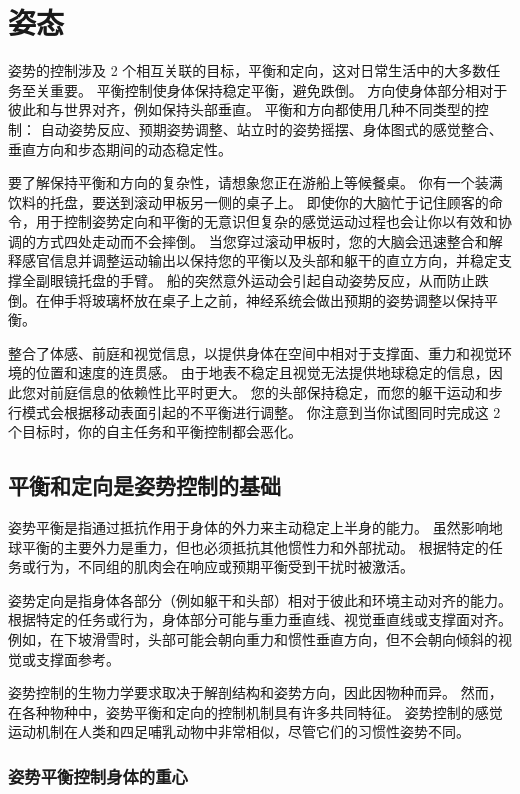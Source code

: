 \chapter{姿态} \label{chap:chap36}

姿势的控制涉及 2 个相互关联的目标，平衡和定向，这对日常生活中的大多数任务至关重要。
平衡控制使身体保持稳定平衡，避免跌倒。
方向使身体部分相对于彼此和与世界对齐，例如保持头部垂直。
平衡和方向都使用几种不同类型的控制：
自动姿势反应、预期姿势调整、站立时的姿势摇摆、身体图式的感觉整合、垂直方向和步态期间的动态稳定性。


要了解保持平衡和方向的复杂性，请想象您正在游船上等候餐桌。
你有一个装满饮料的托盘，要送到滚动甲板另一侧的桌子上。
即使你的大脑忙于记住顾客的命令，用于控制姿势定向和平衡的无意识但复杂的感觉运动过程也会让你以有效和协调的方式四处走动而不会摔倒。
当您穿过滚动甲板时，您的大脑会迅速整合和解释感官信息并调整运动输出以保持您的平衡以及头部和躯干的直立方向，并稳定支撑全副眼镜托盘的手臂。
船的突然意外运动会引起自动姿势反应，从而防止跌倒。在伸手将玻璃杯放在桌子上之前，神经系统会做出预期的姿势调整以保持平衡。


整合了体感、前庭和视觉信息，以提供身体在空间中相对于支撑面、重力和视觉环境的位置和速度的连贯感。
由于地表不稳定且视觉无法提供地球稳定的信息，因此您对前庭信息的依赖性比平时更大。
您的头部保持稳定，而您的躯干运动和步行模式会根据移动表面引起的不平衡进行调整。
你注意到当你试图同时完成这 2 个目标时，你的自主任务和平衡控制都会恶化。



\section{平衡和定向是姿势控制的基础}

姿势平衡是指通过抵抗作用于身体的外力来主动稳定上半身的能力。
虽然影响地球平衡的主要外力是重力，但也必须抵抗其他惯性力和外部扰动。
根据特定的任务或行为，不同组的肌肉会在响应或预期平衡受到干扰时被激活。


姿势定向是指身体各部分（例如躯干和头部）相对于彼此和环境主动对齐的能力。
根据特定的任务或行为，身体部分可能与重力垂直线、视觉垂直线或支撑面对齐。
例如，在下坡滑雪时，头部可能会朝向重力和惯性垂直方向，但不会朝向倾斜的视觉或支撑面参考。


姿势控制的生物力学要求取决于解剖结构和姿势方向，因此因物种而异。
然而，在各种物种中，姿势平衡和定向的控制机制具有许多共同特征。
姿势控制的感觉运动机制在人类和四足哺乳动物中非常相似，尽管它们的习惯性姿势不同。



\subsection{姿势平衡控制身体的重心}


